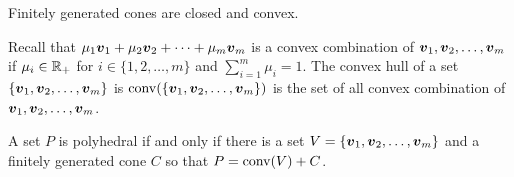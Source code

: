 \begin{corollary}
Finitely generated cones are closed and convex. \hfill \qedsymbol
\end{corollary}

Recall that $\mu_1 {\boldsymbol v}_1 + \mu_2 {\boldsymbol v}_2 + \dots + \mu_m {\boldsymbol v}_m$ is a convex combination of ${\boldsymbol v}_1, {\boldsymbol v}_2, \dots, {\boldsymbol v}_m$ if $\mu_i\in\mathbb R_+$ for $i \in \{1, 2, \dots, m\}$ and $\sum_{i=1}^m\mu_i = 1$. The convex hull of a set $\{{\boldsymbol v}_1, {\boldsymbol v}_2, \dots, {\boldsymbol v}_m\}$ is $\operatorname{conv}(\{{\boldsymbol v}_1, {\boldsymbol v}_2, \dots, {\boldsymbol v}_m\})$ is the set of all convex combination of ${\boldsymbol v}_1, {\boldsymbol v}_2, \dots, {\boldsymbol v}_m$. 

\begin{theorem}\label{thm: mw representation}
A set $P$ is polyhedral if and only if there is a set $V = \{{\boldsymbol v}_1, {\boldsymbol v}_2, \dots, {\boldsymbol v}_m\}$ and a finitely generated cone $C$ so that $P = \operatorname{conv}( V ) + C$.  
\end{theorem}
